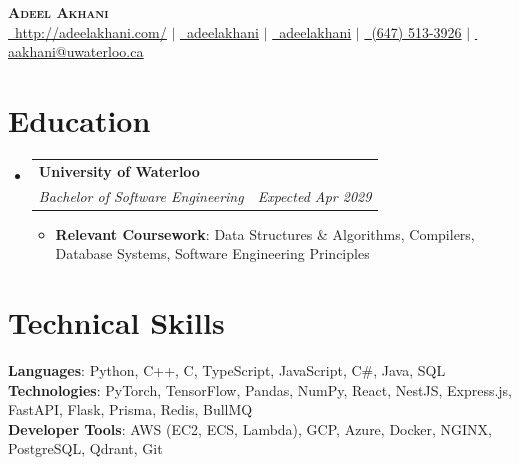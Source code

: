 \documentclass[letterpaper,11pt]{article}
\makeatletter
\newcommand{\resumeItem}[1]{
  \item\small{
    {#1 \vspace{-2pt}}
  }
}
\newcommand{\resumeSubheading}[4]{
  \vspace{-2pt}\item
    \begin{tabular*}{0.97\textwidth}[t]{l@{\extracolsep{\fill}}r}
      \textbf{#1} & #2 \\
      \textit{\small#3} & \textit{\small #4} \\
    \end{tabular*}\vspace{-7pt}
}
\newcommand{\resumeSubHeadingListStart}{\begin{itemize}[leftmargin=0.15in, label={}]}
\newcommand{\resumeSubHeadingListEnd}{\end{itemize}}
\newcommand{\resumeItemListStart}{\begin{itemize}}
\newcommand{\resumeItemListEnd}{\end{itemize}\vspace{-5pt}}
\makeatother
\begin{document}
\begin{center}
    \textbf{\Huge \scshape Adeel Akhani} \\ \vspace{1pt}
    \small
    \href{http://adeelakhani.com/}{\faGlobe\, \underline{http://adeelakhani.com/}} $|$
    \href{https://www.linkedin.com/in/adeelakhani/}{\faLinkedin\, \underline{adeelakhani}} $|$ 
    \href{https://github.com/adeelakhani}{\faGithub\, \underline{adeelakhani}} $|$
    \href{tel:(647) 513-3926}{\faMobile*\, (647) 513-3926} $|$
    \href{mailto:aakhani@uwaterloo.ca}{\faEnvelope\, \underline{aakhani@uwaterloo.ca}}
\end{center}
\section{Education}
    \resumeSubHeadingListStart
        \resumeSubheading
            {University of Waterloo}{}
            {Bachelor of Software Engineering}{\textit{Expected Apr 2029}}
            \resumeItemListStart
                \resumeItem{\textbf{Relevant Coursework}: Data Structures \& Algorithms, Compilers, Database Systems, Software Engineering Principles}
            \resumeItemListEnd
        \resumeSubHeadingListEnd
\section{Technical Skills}
\begin{itemize}[leftmargin=0.15in, label={}]
    \small{\item{
    \textbf{Languages}{: Python, C++, C, TypeScript, JavaScript, C\#, Java, SQL} \\
    \textbf{Technologies}{: PyTorch, TensorFlow, Pandas, NumPy, React, NestJS, Express.js, FastAPI, Flask, Prisma, Redis, BullMQ} \\
    \textbf{Developer Tools}{: AWS (EC2, ECS, Lambda), GCP, Azure, Docker, NGINX, PostgreSQL, Qdrant, Git}
    }}
\end{itemize}
\end{document}
